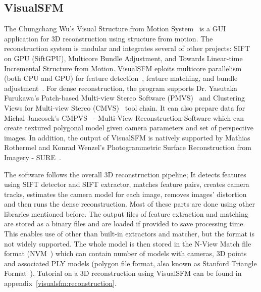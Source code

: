 \subsection*{VisualSFM}
The Chungchang Wu's Visual Structure from Motion System~\cite{www:visual_sfm} is a GUI application for 3D reconstruction using structure from motion. The reconstruction system is modular and integrates several of other projects: SIFT on GPU (SiftGPU), Multicore Bundle Adjustment, and Towards Linear-time Incremental Structure from Motion. VisualSFM eploits multicore parallelism (both CPU and GPU) for feature detection~\cite{siftgpu}, feature matching, and bundle adjustment~\cite{www:multicore-ba}. For dense reconstruction, the program supports Dr. Yasutaka Furukawa's Patch-based Multi-view Stereo Software (PMVS)~\cite{pmvs} and Clustering Views for Multi-view Stereo (CMVS)~\cite{cmvs} tool chain. It can also prepare data for Michal Jancosek's CMPVS~\cite{book:cmpmvs, www:cmpmvs} - Multi-View Reconstruction Software which can create textured polygonal model given camera parameters and set of perspective images. In addition, the output of VisualSFM is natively supported by Mathias Rothermel and Konrad Wenzel's Photogrammetric Surface Reconstruction from Imagery - SURE~\cite{www:sure}.

The software follows the overall 3D reconstruction pipeline; It detects features using SIFT detector and SIFT extractor, matches feature pairs, creates camera tracks, estimates the camera model for each image, removes images' distortion and then runs the dense reconstruction. Most of these parts are done using other libraries mentioned before. The output files of feature extraction and matching are stored as a binary files and are loaded if provided to save processing time. This enables use of other than built-in extractors and matcher, but the format is not widely supported. The whole model is then stored in the N-View Match file format (NVM~\cite{www:nvm}) which can contain number of models with cameras, 3D points and associated PLY models (polygon file format, also known as Stanford Triangle Format~\cite{ply-format}). Tutorial on a 3D reconstruction using VisualSFM can be found in appendix~\ref{visualsfm:reconstruction}.

